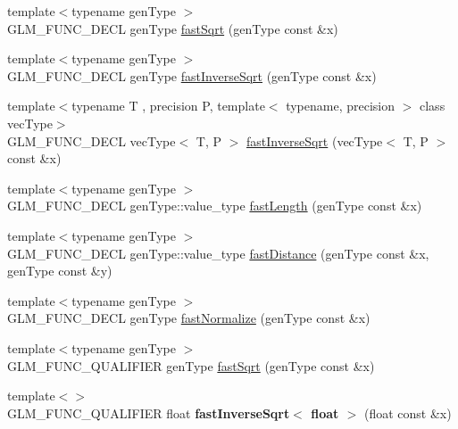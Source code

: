 \begin{DoxyCompactItemize}
\item 
{\footnotesize template$<$typename gen\-Type $>$ }\\G\-L\-M\-\_\-\-F\-U\-N\-C\-\_\-\-D\-E\-C\-L gen\-Type \hyperlink{group__gtx__fast__square__root_gab07ddede2731f3438d687a652c843673}{fast\-Sqrt} (gen\-Type const \&x)
\item 
{\footnotesize template$<$typename gen\-Type $>$ }\\G\-L\-M\-\_\-\-F\-U\-N\-C\-\_\-\-D\-E\-C\-L gen\-Type \hyperlink{group__gtx__fast__square__root_ga65237d716748c6262f316ec1eaf7f073}{fast\-Inverse\-Sqrt} (gen\-Type const \&x)
\item 
{\footnotesize template$<$typename T , precision P, template$<$ typename, precision $>$ class vec\-Type$>$ }\\G\-L\-M\-\_\-\-F\-U\-N\-C\-\_\-\-D\-E\-C\-L vec\-Type$<$ T, P $>$ \hyperlink{group__gtx__fast__square__root_ga903878071f92e51e551791e584a171a1}{fast\-Inverse\-Sqrt} (vec\-Type$<$ T, P $>$ const \&x)
\item 
{\footnotesize template$<$typename gen\-Type $>$ }\\G\-L\-M\-\_\-\-F\-U\-N\-C\-\_\-\-D\-E\-C\-L gen\-Type\-::value\-\_\-type \hyperlink{group__gtx__fast__square__root_ga70aa3c80d8bb22e021c6c3ebdcf8e3ee}{fast\-Length} (gen\-Type const \&x)
\item 
{\footnotesize template$<$typename gen\-Type $>$ }\\G\-L\-M\-\_\-\-F\-U\-N\-C\-\_\-\-D\-E\-C\-L gen\-Type\-::value\-\_\-type \hyperlink{group__gtx__fast__square__root_ga69778792fcadc29f586efa3ec2118cdc}{fast\-Distance} (gen\-Type const \&x, gen\-Type const \&y)
\item 
{\footnotesize template$<$typename gen\-Type $>$ }\\G\-L\-M\-\_\-\-F\-U\-N\-C\-\_\-\-D\-E\-C\-L gen\-Type \hyperlink{group__gtx__fast__square__root_ga3b02c1d6e0c754144e2f1e110bf9f16c}{fast\-Normalize} (gen\-Type const \&x)
\item 
{\footnotesize template$<$typename gen\-Type $>$ }\\G\-L\-M\-\_\-\-F\-U\-N\-C\-\_\-\-Q\-U\-A\-L\-I\-F\-I\-E\-R gen\-Type \hyperlink{group__gtx__fast__square__root_gab07ddede2731f3438d687a652c843673}{fast\-Sqrt} (gen\-Type const \&x)
\item 
\hypertarget{namespaceglm_a3c4d65bdc005cd73dd36a5bccbda7404}{{\footnotesize template$<$$>$ }\\G\-L\-M\-\_\-\-F\-U\-N\-C\-\_\-\-Q\-U\-A\-L\-I\-F\-I\-E\-R float {\bfseries fast\-Inverse\-Sqrt$<$ float $>$} (float const \&x)}\label{namespaceglm_a3c4d65bdc005cd73dd36a5bccbda7404}


\end{DoxyCompactItemize}
